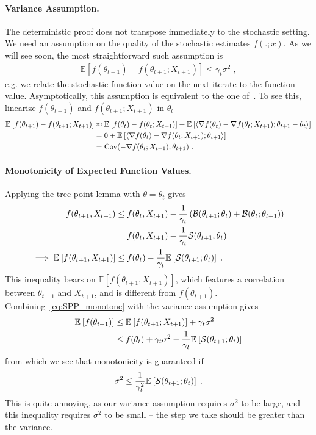 \documentclass{article}
\newcommand*{\expect}[2][]{\ensuremath{\mathbb{E}_{#1} \left[ #2 \right] }} %
\newcommand{\natp}{\theta}
\newcommand{\lr}{\gamma} %
\begin{document}
\paragraph{Variance Assumption.}
The deterministic proof does not transpose immediately to the stochastic setting.
We need an assumption on the quality of the stochastic estimates $f(. ; x)$. 
As we will see soon, the most straightforward such assumption is 
\begin{align}
\boxed{\expect{f(\natp_{t+1}) - f(\natp_{t+1} ; X_{t+1})} \leq \lr_t \sigma^2 \; , }
\label{eq:proximal_variance}
\end{align}
e.g. we relate the stochastic function value on the next iterate to the function value.
Asymptotically, this assumption is equivalent to the one of~\citet{hanzely2018fastest}. 
To see this, linearize $f(\natp_{t+1})$ and $f(\natp_{t+1} ; X_{t+1}) $ in $\natp_t$
\begin{align}
	\expect{f(\natp_{t+1}) - f(\natp_{t+1} ; X_{t+1})} 
	&\approx \expect{f(\natp_{t}) - f(\natp_{t} ; X_{t+1})} + \expect{\langle \nabla f(\natp_t) - \nabla f(\natp_t ; X_{t+1}) ; \natp_{t+1} - \natp_t \rangle } \\
	&= 0 + \expect{\langle \nabla f(\natp_t) - \nabla f(\natp_t ; X_{t+1}) ; \natp_{t+1} \rangle } \\
	& = \Cov(- \nabla f(\natp_t ; X_{t+1})  ; \natp_{t+1} ) \; .
\end{align} 

\paragraph{Monotonicity of Expected Function Values.}
Applying the tree point lemma with $\natp=\natp_t$ gives
\begin{align}
	f(\natp_{t+1}, X_{t+1})  
	&\leq f(\natp_{t}, X_{t+1})  - \inv{\lr_t}\left (\cB(\natp_{t+1} ; \natp_{t}) + \cB(\natp_{t} ; \natp_{t+1}) \right) \\
	&= f(\natp_{t}, X_{t+1})  - \inv{\lr_t} \cS(\natp_{t+1} ; \natp_{t}) \\
	\implies \expect{f(\natp_{t+1}, X_{t+1})} 
	&\leq f(\natp_{t}) - \inv{\lr_t}\expect{\cS(\natp_{t+1} ; \natp_{t})}  \; .
	\label{eq:SPP_monotone}
\end{align}
This inequality bears on $\expect{f(\natp_{t+1}, X_{t+1})}$, which features a correlation between $\natp_{t+1}$ and $X_{t+1}$, and is different from $f(\natp_{t+1})$.
Combining~\eqref{eq:SPP_monotone} with the variance assumption gives
\begin{align}
	\expect{f(\natp_{t+1})} 
	&\leq \expect{f(\natp_{t+1} ; X_{t+1})}  + \lr_t \sigma^2 \\
	&\leq f(\natp_t) +  \lr_t \sigma^2 - \inv{\lr_t}\expect{\cS(\natp_{t+1} ; \natp_{t})}
\end{align}
from which we see that monotonicity is guaranteed if
\begin{align}
	\sigma^2 \leq \inv{\lr_t^2}\expect{\cS(\natp_{t+1} ; \natp_{t})} \; .
\end{align}
This is quite annoying, as our variance assumption requires $\sigma^2$ to be large, and this inequality requires $	\sigma^2 $ to be small -- the step we take should be greater than the variance.
\end{document}
